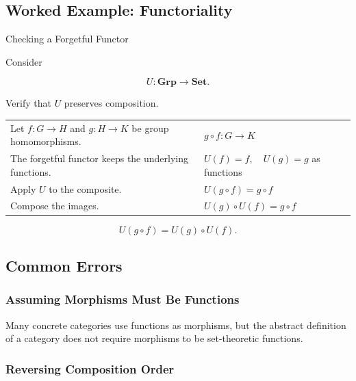 \subsection{Worked Example: Functoriality}
\label{subsec:worked-functoriality}

\begin{workedexamplebox}{Checking a Forgetful Functor}

Consider

\[ U:\mathbf{Grp}\to\mathbf{Set}. \]

Verify that \(U\) preserves composition.

\begin{tabularx}{\textwidth}{@{}>{\raggedright\arraybackslash}p{}X@{}}
Let \(f:G\to H\) and \(g:H\to K\) be group homomorphisms. &
\(g\circ f:G\to K\)\\
The forgetful functor keeps the underlying functions. &
\(U(f)=f,\quad U(g)=g\) as functions\\
Apply \(U\) to the composite. &
\(U(g\circ f)=g\circ f\)\\
Compose the images. &
\(U(g)\circ U(f)=g\circ f\)
\end{tabularx}

\begin{answerbox}
\[ \boxed{U(g\circ f)=U(g)\circ U(f).} \]
\end{answerbox}
\end{workedexamplebox}

\subsection{Common Errors}
\label{subsec:category-common-errors}

\subsubsection{Assuming Morphisms Must Be Functions}

Many concrete categories use functions as morphisms, but the abstract
definition of a category does not require morphisms to be set-theoretic
functions.

\subsubsection{Reversing Composition Order}

